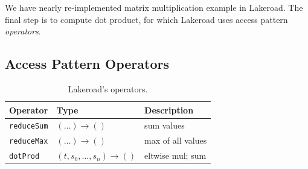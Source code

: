 \documentclass[prologue, dvipsnames, sigplan, screen, review, anonymous]{acmart}
\newcommand{\g}{Lakeroad\xspace}
\begin{document}
We have nearly re-implemented
  matrix multiplication example
  in \g.
The final step
  is to compute dot product, for which
  \g uses 
  access pattern \textit{operators}.
  
\subsection{Access Pattern Operators}

\begin{table}
    \centering
    \begin{tabularx}{\linewidth}{lXX}
    Operator & Type & Description\\
    \hline
    \texttt{reduceSum} & $(\dots) \rightarrow ()$ &
    sum values
    \\
    
    \texttt{reduceMax} & $(\dots) \rightarrow ()$&
    max of all values\\
    
    \texttt{dotProd} &
    $(t,s_0, \dots, s_n)\rightarrow ()$ &
    eltwise mul; sum
    \\
    

   
    \end{tabularx}
    \caption{\g's operators.}
    \label{tab:operators}
\end{table}
\end{document}
